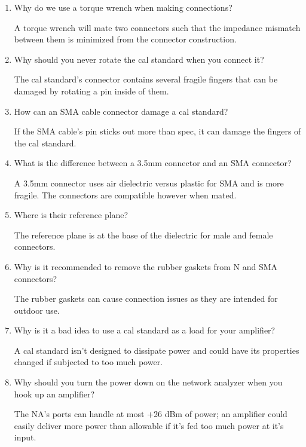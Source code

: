 \documentclass[11pt]{article}
\begin{document}
\begin{enumerate}
	\item Why do we use a torque wrench when making connections?
	
	A torque wrench will mate two connectors such that the impedance mismatch between them is minimized from the connector construction.
	
	\item Why should you never rotate the cal standard when you connect it?
	
	The cal standard's connector contains several fragile fingers that can be damaged by rotating a pin inside of them.
	
	\item How can an SMA cable connector damage a cal standard?
	
	If the SMA cable's pin sticks out more than spec, it can damage the fingers of the cal standard.
	
	\item What is the difference between a 3.5mm connector and an SMA connector?
	
	A 3.5mm connector uses air dielectric versus plastic for SMA and is more fragile. The connectors are compatible however when mated.
	
	\item Where is their reference plane?
	
	The reference plane is at the base of the dielectric for male and female connectors. 
	
	\item Why is it recommended to remove the rubber gaskets from N and SMA connectors?
	
	The rubber gaskets can cause connection issues as they are intended for outdoor use.
	
	\item Why is it a bad idea to use a cal standard as a load for your amplifier?
	
	A cal standard isn't designed to dissipate power and could have its properties changed if subjected to too much power.
	
	\item Why should you turn the power down on the network analyzer when you hook up an amplifier?
	
	The NA's ports can handle at most +26 dBm of power; an amplifier could easily deliver more power than allowable if it's fed too much power at it's input.	
\end{enumerate}
\end{document}
